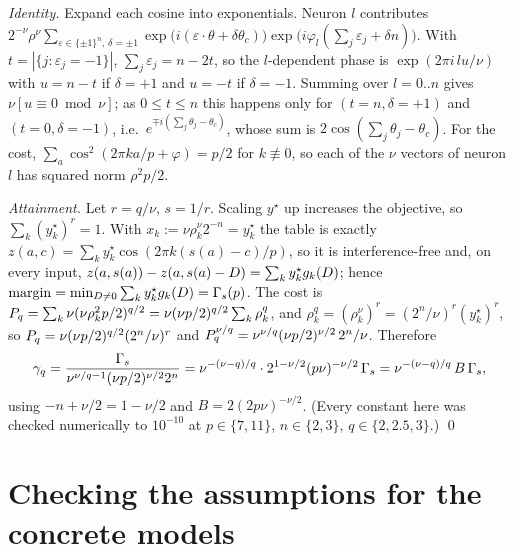 \emph{Identity.} Expand each cosine into exponentials. Neuron $l$ contributes
$2^{-\nu}\rho^\nu\sum_{\varepsilon\in\{\pm1\}^n,\,\delta=\pm1}\exp\big(i(\varepsilon\cdot\theta+\delta\theta_c)\big)\exp\big(i\varphi_l(\sum_j\varepsilon_j+\delta n)\big)$.
With $t=|\{j:\varepsilon_j=-1\}|$, $\sum_j\varepsilon_j=n-2t$, so the $l$-dependent phase is
$\exp(2\pi i\,lu/\nu)$ with $u=n-t$ if $\delta=+1$ and $u=-t$ if $\delta=-1$. Summing over $l=0..n$ gives
$\nu[u\equiv0\bmod\nu]$; as $0\le t\le n$ this happens only for $(t=n,\delta=+1)$ and $(t=0,\delta=-1)$, i.e.\
$e^{\mp i(\sum_j\theta_j-\theta_c)}$, whose sum is $2\cos(\sum_j\theta_j-\theta_c)$. For the cost,
$\sum_a\cos^2(2\pi ka/p+\varphi)=p/2$ for $k\not\equiv0$, so each of the $\nu$ vectors of neuron $l$ has squared
norm $\rho^2p/2$.

\emph{Attainment.} Let $r=q/\nu$, $s=1/r$. Scaling $y^\star$ up increases the objective, so
$\sum_k(y^\star_k)^r=1$. With $x_k:=\nu\rho_k^\nu2^{-n}=y^\star_k$ the table is exactly
$z(a,c)=\sum_ky^\star_k\cos(2\pi k(s(a)-c)/p)$, so it is interference-free and, on every input,
$z(a,s(a))-z(a,s(a)-D)=\sum_ky^\star_kg_{k}(D)$; hence $\operatorname{margin}=\min_{D\neq0}\sum_ky^\star_kg_{k}(D)=\Gamma_s(p)$.
The cost is $P_q=\sum_k\nu(\nu\rho_k^2p/2)^{q/2}=\nu(\nu p/2)^{q/2}\sum_k\rho_k^q$, and
$\rho_k^q=(\rho_k^\nu)^r=(2^n/\nu)^r(y^\star_k)^r$, so $P_q=\nu(\nu p/2)^{q/2}(2^n/\nu)^r$ and
$P_q^{\nu/q}=\nu^{\nu/q}(\nu p/2)^{\nu/2}\,2^n/\nu$. Therefore
\[
\gamma_q=\frac{\Gamma_s}{\nu^{\nu/q-1}(\nu p/2)^{\nu/2}2^n}=\nu^{-(\nu-q)/q}\cdot2^{1-\nu/2}(p\nu)^{-\nu/2}\,\Gamma_s=\nu^{-(\nu-q)/q}\,B\,\Gamma_s ,
\]
using $-n+\nu/2=1-\nu/2$ and $B=2(2p\nu)^{-\nu/2}$. (Every constant here was checked numerically to
$10^{-10}$ at $p\in\{7,11\}$, $n\in\{2,3\}$, $q\in\{2,2.5,3\}$.)
\qed

\section{Checking the assumptions for the concrete models}
\label{app:models}


